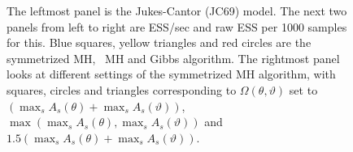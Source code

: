 \begin{figure}
\begin{minipage}[!hp]{0.24\linewidth}
\end{minipage}
  \caption{The leftmost panel is the Jukes-Cantor (JC69) model. The next two panels from left to right are ESS/sec and raw ESS per 1000 samples for this. 
    Blue squares, yellow triangles and red circles are the symmetrized MH, \naive\ MH and Gibbs algorithm.
    The rightmost panel looks at different settings of the symmetrized MH algorithm, with squares, circles and triangles corresponding to 
$\Omega(\theta,\vartheta)$ set to $(\max_s A_s(\theta) + \max_s A_s(\vartheta))$, $\max(\max_s A_s(\theta), \max_s A_s(\vartheta))$ and  $1.5(\max_s A_s(\theta) + \max_s A_s(\vartheta))$.
     \label{fig:ESS_JC}
   }
 \end{figure}

